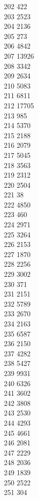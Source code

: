 { 202	422 \\
 203	2523 \\
 204	2136 \\
 205	273 \\
 206	4842 \\
 207	13926 \\
 208	3342 \\
 209	2634 \\
 210	5083 \\
 211	6811 \\
 212	17705 \\
 213	985 \\
 214	5370 \\
 215	2188 \\
 216	2079 \\
 217	5045 \\
 218	3563 \\
 219	2312 \\
 220	2504 \\
 221	38 \\
 222	4850 \\
 223	460 \\
 224	2971 \\
 225	3264 \\
 226	2153 \\
 227	1870 \\
 228	2256 \\
 229	3002 \\
 230	371 \\
 231	2151 \\
 232	5789 \\
 233	2670 \\
 234	2163 \\
 235	6587 \\
 236	2150 \\
 237	4282 \\
 238	5427 \\
 239	9931 \\
 240	6326 \\
 241	3602 \\
 242	3808 \\
 243	2530 \\
 244	4293 \\
 245	4661 \\
 246	2081 \\
 247	2229 \\
 248	2036 \\
 249	1839 \\
 250	2522 \\
 251	304 \\
}
